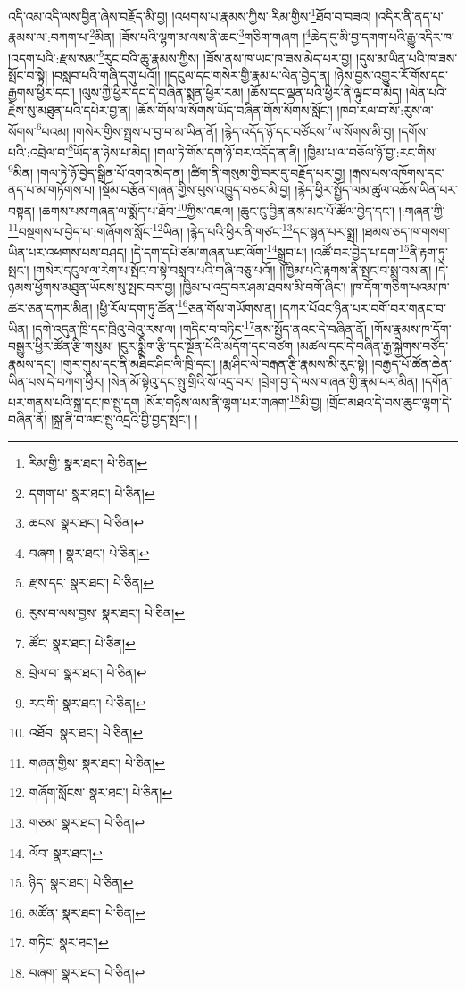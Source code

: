 འདི་འམ་འདི་ལས་བྱིན་ཞེས་བརྗོད་མི་བྱ། །འཕགས་པ་རྣམས་ཀྱིས་:རིམ་གྱིས་\footnote{རིམ་གྱི་  སྣར་ཐང་།  པེ་ཅིན། }ཐོབ་བ་བཟའ། །འདིར་ནི་ནད་པ་རྣམས་ལ་:བཀག་པ་\footnote{དགག་པ་  སྣར་ཐང་།  པེ་ཅིན། }མིན། །ཟོས་པའི་ལྷག་མ་ལས་ནི་ཆང་\footnote{ཆངས་  སྣར་ཐང་།  པེ་ཅིན། }གཅིག་གཞག །\footnote{བཞག །  སྣར་ཐང་།  པེ་ཅིན། }ཆེད་དུ་མི་བྱ་དགག་པའི་རྒྱུ་འདིར་ཁ། །འདག་པའི་:རྫས་སམ་\footnote{རྫས་དང་  སྣར་ཐང་།  པེ་ཅིན། }རུང་བའི་ཆུ་རྣམས་ཀྱིས། །ཟོས་ནས་ཁ་ཡང་ཁ་ཟས་མེད་པར་བྱ། །དུས་མ་ཡིན་པའི་ཁ་ཟས་སྤོང་བ་སྟེ། །བསླབ་པའི་གཞི་དགུ་པའོ།། །།དངུལ་དང་གསེར་གྱི་རྣམ་པ་ལེན་བྱེད་ན། །ཉེས་བྱས་འགྱུར་རོ་གོས་དང་རྒྱགས་ཕྱིར་དང་། །ལུས་ཀྱི་ཕྱིར་དང་དེ་བཞིན་སྨན་ཕྱིར་རམ། །ཆོས་དང་ལྡན་པའི་ཕྱིར་ནི་ལྟུང་བ་མེད། །ལེན་པའི་རྗེས་སུ་མཐུན་པའི་དཔེར་བྱ་ན། །ཆོས་གོས་ལ་སོགས་ཡོད་བཞིན་གོས་སོགས་སློང་། །ཁབ་རལ་བ་སོ་:རུས་ལ་སོགས་\footnote{རུས་བ་ལས་བྱས་  སྣར་ཐང་།  པེ་ཅིན། }པའམ། །གསེར་གྱིས་སྤྲས་པ་བྱ་བ་མ་ཡིན་ནོ། །རྙེད་འདོད་ཉོ་དང་བཙོངས་\footnote{ཚོང་  སྣར་ཐང་།  པེ་ཅིན། }ལ་སོགས་མི་བྱ། །དགོས་པའི་:འབྲེལ་བ་\footnote{བྲེལ་བ་  སྣར་ཐང་།  པེ་ཅིན། }ཡོད་ན་ཉེས་པ་མེད། །གལ་ཏེ་གོས་དག་ཉོ་བར་འདོད་ན་ནི། །ཁྱིམ་པ་ལ་བཅོལ་ཉོ་བྱ་:རང་གིས་\footnote{རང་གི་  སྣར་ཐང་།  པེ་ཅིན། }མིན། །གལ་ཏེ་ཉོ་བྱེད་སྒྲིན་པོ་འགའ་མེད་ན། །ཚིག་ནི་གསུམ་གྱི་བར་དུ་བརྗོད་པར་བྱ། །རྒས་པས་འཁོགས་དང་ནད་པ་མ་གཏོགས་པ། །སྡོམ་བརྩོན་གཞན་གྱིས་པུས་འཁྱུད་བཅང་མི་བྱ། །རྙེད་ཕྱིར་སྤྱོད་ལམ་ཚུལ་འཆོས་ཡིན་པར་བསྟན། །ཆགས་པས་གཞན་ལ་སྨོད་པ་ཐོབ་\footnote{འཐོབ་  སྣར་ཐང་།  པེ་ཅིན། }ཀྱིས་འཇལ། །ཆུང་ངུ་བྱིན་ནས་མང་པོ་ཚོལ་བྱེད་དང་། །:གཞན་གྱི་\footnote{གཞན་གྱིས་  སྣར་ཐང་།  པེ་ཅིན། }བསྔགས་པ་བྱེད་པ་:གཞོགས་སློང་\footnote{གཞོག་སློངས་  སྣར་ཐང་།  པེ་ཅིན། }ཡིན། །རྙེད་པའི་ཕྱིར་ནི་གཙང་\footnote{གཅམ་  སྣར་ཐང་།  པེ་ཅིན། }དང་སྙན་པར་སྨྲ། །ཐམས་ཅད་ཁ་གསག་ཡིན་པར་འཕགས་པས་བཤད། །དེ་དག་དཔེ་ཙམ་གཞན་ཡང་ལོག་\footnote{ལོབ་  སྣར་ཐང་། }སྒྲུབ་པ། །འཚོ་བར་བྱེད་པ་དག་\footnote{ཉིད་  སྣར་ཐང་།  པེ་ཅིན། }ནི་རྟག་ཏུ་སྤང་། །གསེར་དངུལ་ལ་རེག་པ་སྤོང་བ་སྟེ་བསླབ་པའི་གཞི་བཅུ་པའོ།། །།ཁྱིམ་པའི་རྟགས་ནི་སྤང་བ་སྨྲ་བས་ན། །དེ་ཉམས་ཕྱོགས་མཐུན་ཡོངས་སུ་སྤང་བར་བྱ། །ཁྱིམ་པ་འདྲ་བར་ཤམ་ཐབས་མི་བགོ་ཞིང་། །ཁ་དོག་གཅིག་པའམ་ཁ་ཚར་ཅན་དཀར་མིན། །ཕྱི་རོལ་དག་ཏུ་ཚོན་\footnote{མཚོན་  སྣར་ཐང་།  པེ་ཅིན། }ཅན་གོས་གཡོགས་ན། །དཀར་པོའང་ཉིན་པར་བགོ་བར་གནང་བ་ཡིན། །དགེ་འདུན་ཁྲི་དང་ཁྲིའུ་བེའུ་རས་ལ། །གདིང་བ་བཏིང་\footnote{གཏིང་  སྣར་ཐང་། }ནས་སྤྱོད་ནའང་དེ་བཞིན་ནོ། །གོས་རྣམས་ཁ་དོག་བསྒྱུར་ཕྱིར་ཚོན་རྩི་གསུམ། །ངུར་སྨྲིག་རྩི་དང་སྔོན་པོའི་མདོག་དང་བཙག །མཚལ་དང་དེ་བཞིན་རྒྱ་སྐྱེགས་བཙོད་རྣམས་དང་། །གུར་གུམ་དང་ནི་མཐིང་ཤིང་ལི་ཁྲི་དང་། །རྨ་ཤིང་ལེ་བརྒན་རྩི་རྣམས་མི་རུང་སྟེ། །བརྒྱད་པོ་ཚོན་ཆེན་ཡིན་པས་དེ་བཀག་ཕྱིར། །སེན་མོ་སྟེའུ་དང་སྤུ་གྲིའི་སོ་འདྲ་བར། །བྲེག་བྱ་དེ་ལས་གཞན་གྱི་རྣམ་པར་མིན། །དགོན་པར་གནས་པའི་སྐྲ་དང་ཁ་སྤུ་དག །སོར་གཉིས་ལས་ནི་ལྷག་པར་གཞག་\footnote{བཞག་  སྣར་ཐང་།  པེ་ཅིན། }མི་བྱ། །གྲོང་མཐའ་དེ་བས་ཆུང་ལྷག་དེ་བཞིན་ནོ། །སྐྲ་ནི་བ་ལང་སྤུ་འདྲའི་བྱི་བྱད་སྤང་། །
